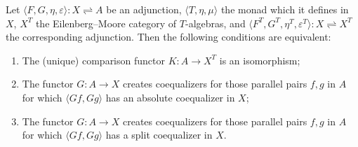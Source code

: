 Let $\langle F, G, \eta, \varepsilon \rangle : X \rightleftharpoons A$ be an adjunction, $\langle T, \eta, \mu \rangle$ the monad which it defines in $X$, $X^T$ the Eilenberg--Moore category of $T$-algebras, and $\langle F^T, G^T, \eta^T, \varepsilon^T \rangle : X \rightleftharpoons X^T$ the corresponding adjunction. Then the following conditions are equivalent:
\begin{enumerate}
\item[(i)] The (unique) comparison functor $K : A \to X^T$ is an isomorphism;
\item[(ii)] The functor $G : A \to X$ creates coequalizers for those parallel pairs $f, g$ in $A$ for which $\langle G f, G g \rangle$ has an absolute coequalizer in $X$;
\item[(iii)] The functor $G : A \to X$ creates coequalizers for those parallel pairs $f, g$ in $A$ for which $\langle G f, G g \rangle$ has a split coequalizer in $X$.
\end{enumerate}
